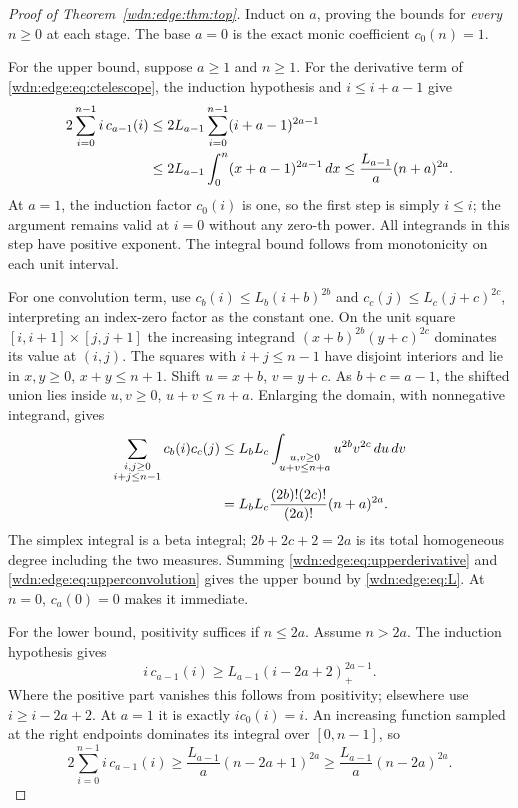 \documentclass[11pt,letterpaper]{article}
\theoremstyle{remark}\newtheorem{remark}[theorem]{Remark}
\begin{document}
\begin{proof}[Proof of Theorem~\ref{wdn:edge:thm:top}]
Induct on $a$, proving the bounds for \emph{every} $n\ge0$ at each stage.
The base $a=0$ is the exact monic coefficient $c_0(n)=1$.

For the upper bound, suppose $a\ge1$ and $n\ge1$. For the derivative
term of \eqref{wdn:edge:eq:ctelescope}, the induction hypothesis and
$i\le i+a-1$ give
\begin{align}\label{wdn:edge:eq:upperderivative}
 2\sum_{i=0}^{n-1}i\,c_{a-1}(i)
 &\le2L_{a-1}\sum_{i=0}^{n-1}(i+a-1)^{2a-1}\notag\\
 &\le2L_{a-1}\int_0^n(x+a-1)^{2a-1}\,dx
 \le\frac{L_{a-1}}a(n+a)^{2a}.
\end{align}
At $a=1$, the induction factor $c_0(i)$ is one, so the first step is
simply $i\le i$; the argument remains valid at $i=0$ without any
zero-th power. All integrands in this step have positive exponent.
The integral bound follows from monotonicity on each unit interval.

For one convolution term, use
$c_b(i)\le L_b(i+b)^{2b}$ and
$c_c(j)\le L_c(j+c)^{2c}$, interpreting an index-zero factor as the
constant one. On the unit square $[i,i+1]\times[j,j+1]$ the increasing
integrand $(x+b)^{2b}(y+c)^{2c}$ dominates its value at $(i,j)$.
The squares with $i+j\le n-1$ have disjoint interiors and lie in
$x,y\ge0$, $x+y\le n+1$. Shift $u=x+b$, $v=y+c$.
As $b+c=a-1$, the shifted union lies inside
$u,v\ge0$, $u+v\le n+a$. Enlarging the domain, with nonnegative
integrand, gives
\begin{align}\label{wdn:edge:eq:upperconvolution}
 \sum_{\substack{i,j\ge0\\i+j\le n-1}}c_b(i)c_c(j)
 &\le L_bL_c\int_{\substack{u,v\ge0\\u+v\le n+a}}
                       u^{2b}v^{2c}\,du\,dv\notag\\
 &=L_bL_c\frac{(2b)!(2c)!}{(2a)!}(n+a)^{2a}.
\end{align}
The simplex integral is a beta integral; $2b+2c+2=2a$ is its total
homogeneous degree including the two measures. Summing
\eqref{wdn:edge:eq:upperderivative} and \eqref{wdn:edge:eq:upperconvolution} gives the
upper bound by \eqref{wdn:edge:eq:L}. At $n=0$, $c_a(0)=0$ makes it immediate.

For the lower bound, positivity suffices if $n\le2a$. Assume $n>2a$.
The induction hypothesis gives
\[
 i\,c_{a-1}(i)\ge L_{a-1}(i-2a+2)_+^{2a-1}.
\]
Where the positive part vanishes this follows from positivity; elsewhere
use $i\ge i-2a+2$. At $a=1$ it is exactly $i c_0(i)=i$.
An increasing function sampled at the right endpoints dominates its
integral over $[0,n-1]$, so
\begin{equation}\label{wdn:edge:eq:lowerderivative}
 2\sum_{i=0}^{n-1}i\,c_{a-1}(i)
 \ge\frac{L_{a-1}}a(n-2a+1)^{2a}
 \ge\frac{L_{a-1}}a(n-2a)^{2a}.
\end{equation}


\end{proof}
\end{document}
